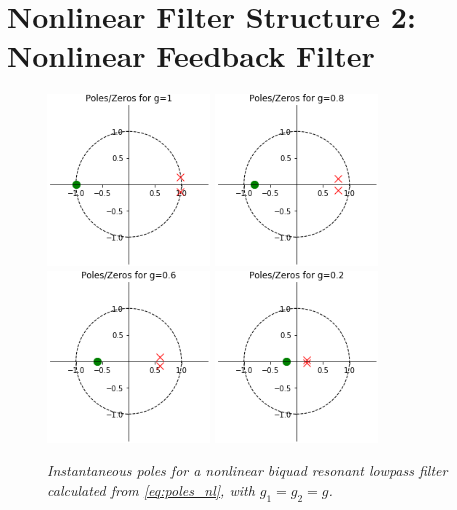 \documentclass[twoside,a4paper]{article}
\begin{document}
\section{Nonlinear Filter Structure 2: Nonlinear Feedback Filter}
%
\begin{figure}[ht]
    \includegraphics[width=1.7in]{../Pics/pz1.png}
    \includegraphics[width=1.7in]{../Pics/pz08.png}
    \includegraphics[width=1.7in]{../Pics/pz06.png}
    \includegraphics[width=1.7in]{../Pics/pz02.png}
    \caption{\label{pzPlots}{\it Instantaneous poles for a nonlinear biquad resonant
                                lowpass filter calculated from \cref{eq:poles_nl}, with
                                $g_1 = g_2 = g$.}}
\end{figure}
\end{document}
